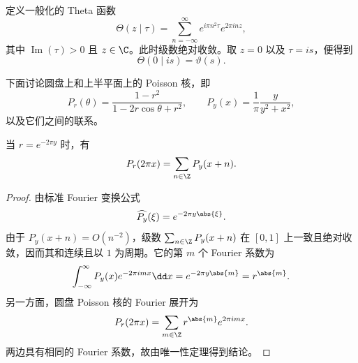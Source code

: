 \begin{definition}
定义一般化的 Theta 函数
	\[
	\Theta(z\mid\tau)
	=
	\sum_{n=-\infty}^{\infty}
	e^{i\pi n^2\tau}e^{2\pi i n z},
	\]
	其中 $\operatorname{Im}(\tau)>0$ 且 $z\in\C$。此时级数绝对收敛。取 $z=0$ 以及 $\tau=is$，便得到
	\[
	\Theta(0\mid is)=\vartheta(s).
	\]
\end{definition}
\newpage
下面讨论圆盘上和上半平面上的 Poisson 核，即
\[
P_r(\theta)=\frac{1-r^2}{1-2r\cos\theta+r^2},
\qquad
P_y(x)=\frac1\pi\frac{y}{y^2+x^2},
\]
以及它们之间的联系。

\begin{theorem}
	当 $r=e^{-2\pi y}$ 时，有
	\[
	P_r(2\pi x)=\sum_{n\in\Z}P_y(x+n).
	\]
	\label{thm:poisson-kernel-periodization}
\end{theorem}

\begin{proof}
	由标准 Fourier 变换公式
	\[
	\widehat{P_y}(\xi)=e^{-2\pi y\abs{\xi}}.
	\]
	由于 $P_y(x+n)=O(n^{-2})$，级数 $\sum_{n\in\Z}P_y(x+n)$ 在 $[0,1]$ 上一致且绝对收敛，因而其和连续且以 $1$ 为周期。它的第 $m$ 个 Fourier 系数为
	\[
	\int_{-\infty}^{\infty}P_y(x)e^{-2\pi i m x}\dd x
	=e^{-2\pi y\abs{m}}
	=r^{\abs{m}}.
	\]
	另一方面，圆盘 Poisson 核的 Fourier 展开为
	\[
	P_r(2\pi x)=\sum_{m\in\Z}r^{\abs{m}}e^{2\pi i m x}.
	\]
	两边具有相同的 Fourier 系数，故由唯一性定理得到结论。
\end{proof}
